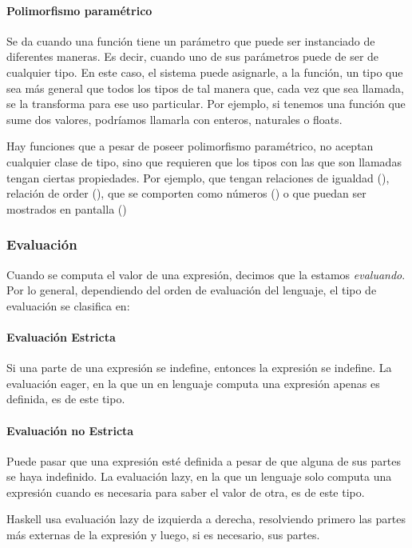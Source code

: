 \paragraph{Polimorfismo paramétrico} Se da cuando una función tiene un parámetro que puede ser instanciado de diferentes maneras. Es decir, cuando uno de sus parámetros puede de ser de cualquier tipo. En este caso, el sistema puede asignarle, a la función, un tipo que sea más general que todos los tipos de tal manera que, cada vez que sea llamada, se la transforma para ese uso particular. Por ejemplo, si tenemos una función que sume dos valores, podríamos llamarla con enteros, naturales o floats.

Hay funciones que a pesar de poseer polimorfismo paramétrico, no aceptan cualquier clase de tipo, sino que requieren que los tipos con las que son llamadas tengan ciertas propiedades. Por ejemplo, que tengan relaciones de igualdad (), relación de order (), que se comporten como números () o que puedan ser mostrados en pantalla ()

\subsubsection{Evaluación}
Cuando se computa el valor de una expresión, decimos que la estamos \textit{evaluando}. Por lo general, dependiendo del orden de evaluación del lenguaje, el tipo de evaluación se  clasifica en:

\paragraph{Evaluación Estricta} Si una parte de una expresión se indefine, entonces la expresión se indefine. La evaluación eager, en la que un en lenguaje computa una expresión apenas es definida, es de este tipo. 

\paragraph{Evaluación no Estricta} Puede pasar que una expresión esté definida a pesar de que alguna de sus partes se haya indefinido. La evaluación lazy, en la que un lenguaje solo computa una expresión cuando es necesaria para saber el valor de otra, es de este tipo.

Haskell usa evaluación lazy de izquierda a derecha, resolviendo primero las partes más externas de la expresión y luego, si es necesario, sus partes.

